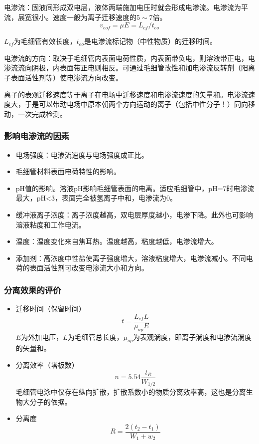 电渗流：固液间形成双电层，液体两端施加电压时就会形成电渗流。电渗流为平流，展宽很小。速度一般为离子迁移速度的$5\sim 7$倍。
\begin{equation*}
	v_{eof}=\mu E=L_{ef}/t_{eo}
\end{equation*}

$L_{ef}$为毛细管有效长度，$t_{eo}$是电渗流标记物（中性物质）的迁移时间。

电渗流的方向：取决于毛细管内表面电荷性质，内表面带负电，则溶液带正电，电渗流流向阴极，内表面带正电则相反。可通过毛细管改性和加电渗流反转剂（阳离子表面活性剂等）使电渗流方向改变。

离子的表观迁移速度等于离子在电场中迁移速度和电渗流速度的矢量和。电渗流速度大，于是可以带动电场中原本朝两个方向运动的离子（包括中性分子！）同向移动，一次完成检测。

\subsubsection{影响电渗流的因素}
\begin{itemize}
	\item 电场强度：电渗流速度与电场强度成正比。
	\item 毛细管材料表面电荷特性的影响。
	\item pH值的影响。溶液pH影响毛细管表面的电离。适应毛细管中，pH=7时电渗流最大，pH<3，表面完全被氢离子中和，电渗流为0。
	\item 缓冲液离子浓度：离子浓度越高，双电层厚度越小，电渗下降。此外也可影响溶液粘度和工作电流。
	\item 温度：温度变化来自焦耳热。温度越高，粘度越低，电渗流增大。
	\item 添加剂：高浓度中性盐使离子强度增大，溶液粘度增大，电渗流减小。不同电荷的表面活性剂可改变电渗流大小和方向。
\end{itemize}

\subsubsection{分离效果的评价}
\begin{itemize}
	\item 迁移时间（保留时间）
	\[t=\dfrac{L_{ef}L}{\mu_{ap}E}\]
	$E$为外加电压，$L$为毛细管总长度，$\mu_{ap}$为表观淌度，即离子淌度和电渗流淌度的矢量和。
	\item 分离效率（塔板数）
	\[n=5.54\dfrac{t_R}{W_{1/2}}\]
	毛细管电泳中仅存在纵向扩散，扩散系数小的物质分离效率高，这也是分离生物大分子的依据。
	\item 分离度
	\[R=\dfrac{2(t_2-t_1)}{W_1+w_2}\]
\end{itemize}

